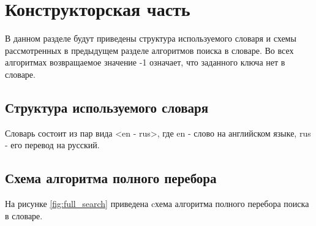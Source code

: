 \chapter{Конструкторская часть}

В данном разделе будут приведены структура используемого словаря и схемы рассмотренных в предыдущем разделе алгоритмов поиска в словаре. Во всех алгоритмах возвращаемое значение -1 означает, что заданного ключа нет в словаре. 

\section{Структура используемого словаря}
Словарь состоит из пар вида <en - rus>, где en - слово на английском языке, rus - его перевод на русский.

\section{Схема алгоритма полного перебора}



На рисунке \ref{fig:full_search} приведена cхема алгоритма полного перебора поиска в словаре.

